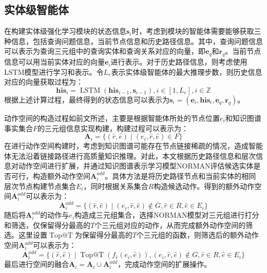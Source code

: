 \documentclass[algorithmlist, AutoFakeBold, AutoFakeSlant, figurelist, tablelist, nomlist, engineering]{seuthesix}
\begin{document}
\subsection{实体级智能体}
在构建实体级强化学习模块的状态信息$\bm{s}_i$时，考虑到模块的智能体需要能够获取三种信息，包括查询问题信息，当前节点信息和历史路径信息。其中，查询问题信息可以表示为查询三元组中的查询实体和查询关系对应的向量，即$\bm{e}_q$和$\bm{r}_q$。当前节点信息可以用当前实体对应的向量$\bm{e}_i$进行表示。对于历史路径信息，则考虑使用LSTM模型进行学习和表示。令$L_e$表示实体级智能体的最大推理步数，则历史信息对应的向量获取过程为：
\begin{equation}
  \bm{his}_i=\operatorname{LSTM}\left(\bm{his}_{i - 1}, \bm{s}_{i - 1}\right), i \in [1, L_e], i \in \mathbb{Z}
  \label{equation_HistoryLSTM}
\end{equation}
根据上述计算过程，最终得到的状态信息可以表示为$\bm{s}_i = (\bm{e}_i, \bm{his}_i, \bm{e}_q, \bm{r}_q)$。

动作空间的构造过程如前文所述，主要是根据智能体所处的节点位置$e_i$和知识图谱事实集合$F$的三元组信息实现构建，构建过程可以表示为：
\begin{equation}
  \bm{A}_i = \{(\hat{r}, \hat{e}) \mid (e_i, \hat{r}, \hat{e}) \in F\}
  \label{base_1}
\end{equation}
在进行动作空间构建时，考虑到知识图谱可能存在节点链接稀疏的情况，造成智能体无法沿着链接路径进行高质量知识推理。对此，本文根据历史路径信息和层次信息对动作空间进行扩展，并通过知识图谱表示学习模型NORMAN评估候选实体是否可行，构造额外动作空间$\bm{A}_{i}^{add}$。具体方法是将历史路径节点和当前实体的相同层次节点构建节点集合$E_i$，同时根据关系集合$R$构造候选动作。得到的额外动作空间$\bm{A}_{i}^{add}$可以表示为：
\begin{equation}
  \bm{A}_{i}^{add} = \{(\hat{r}, \hat{e}) \mid (e_i, \hat{r}, \hat{e}) \notin G, \hat{r} \in R, \hat{e} \in E_i \}
  \label{extra_1}
\end{equation}
随后将$\bm{A}_{i}^{add}$的动作与$e_i$构造成三元组集合，选择NORMAN模型对三元组进行打分和筛选，仅保留得分最高的$T$个三元组对应的动作，从而完成额外动作空间的筛选。这里设置$\operatorname{Top@T}$为保留得分最高的$T$个三元组的函数，则筛选后的额外动作空间$\bm{A}_{i}^{add}$可以表示为：
\begin{equation}
  \bm{A}_i^{add} = \{(\hat{r}, \hat{e}) \mid \operatorname{Top@T}(f_{\hat{r}}(e_i, \hat{e})), (e_i, \hat{r}, \hat{e}) \notin G, \hat{r} \in R, \hat{e} \in E_i \}
\end{equation}
最后进行空间的融合$\bm{A}_i = \bm{A}_i \cup \bm{A}_{i}^{add} $，完成动作空间的扩展操作。
\end{document}
